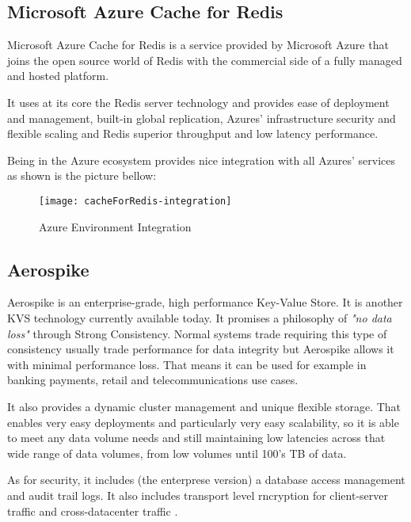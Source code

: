 \subsection{Microsoft Azure Cache for Redis}
\label{ssec:microsoft_azure_cache_for_redis}

Microsoft Azure Cache for Redis \cite{cache-for-redis:1} is a service provided by Microsoft Azure that joins the open source world of Redis with the commercial side of a fully managed and hosted platform.

It uses at its core the Redis server technology and provides ease of deployment and management, built-in global replication, Azures' infrastructure security and flexible scaling and Redis superior throughput and low latency performance.

Being in the Azure ecosystem provides nice integration with all Azures' services as shown is the picture bellow:

\begin{figure}[htbp]
	\centering
	{\texttt{[image: cacheForRedis-integration]}}%
	\caption{Azure Environment Integration}
\end{figure}

\subsection{Aerospike}
\label{ssec:aerospike}

Aerospike \cite{aerospike:1} is an enterprise-grade, high performance Key-Value Store. It is another \gls{KVS} technology currently available today. It promises a philosophy of \textit{"no data loss" } through Strong Consistency. Normal systems trade requiring this type of consistency usually trade performance for data integrity but Aerospike allows it  with minimal performance loss. That means it can be used for example in banking payments, retail and telecommunications use cases.

It also provides a dynamic cluster management and unique flexible storage. That enables very easy deployments and particularly very easy scalability, so it is able to meet any data volume needs and still maintaining low latencies across that wide range of data volumes, from low volumes until 100's \gls{TB} of data.

As for security, it includes (the enterprese version) a database access management and audit trail logs. It also includes transport level rncryption for client-server traffic and cross-datacenter traffic \cite{aerospike:2}.

